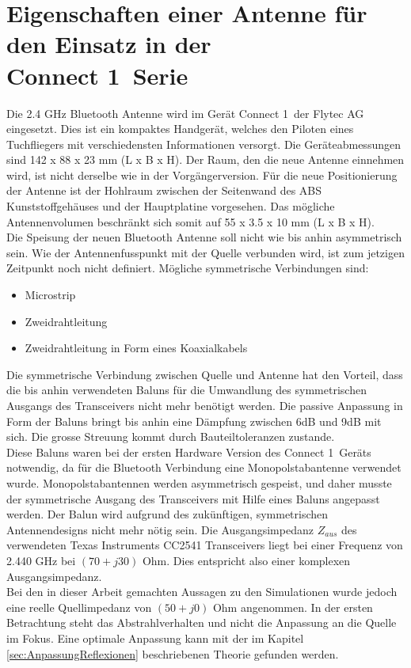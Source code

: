 \section{Eigenschaften einer Antenne für den Einsatz in der \\ \glqq Connect 1\grqq \ Serie}\label{sec:EigenschaftenAntenne}
Die 2.4 GHz Bluetooth Antenne wird im Gerät \glqq Connect 1\grqq \ der Flytec AG eingesetzt. Dies ist ein kompaktes Handgerät, welches den Piloten eines Tuchfliegers mit verschiedensten Informationen versorgt. Die Geräteabmessungen sind 142 x 88 x 23 mm (L x B x H). Der Raum, den die neue Antenne einnehmen wird, ist nicht derselbe wie in der Vorgängerversion. Für die neue Positionierung der Antenne ist der Hohlraum zwischen der Seitenwand des ABS Kunststoffgehäuses und der Hauptplatine vorgesehen. Das mögliche Antennenvolumen beschränkt sich somit auf 55 x 3.5 x 10 mm (L x B x H).\\
Die Speisung der neuen Bluetooth Antenne soll nicht wie bis anhin asymmetrisch sein. Wie der Antennenfusspunkt mit der Quelle verbunden wird, ist zum jetzigen Zeitpunkt noch nicht definiert. Mögliche symmetrische Verbindungen sind:
\begin{itemize}
\item Microstrip 
\item Zweidrahtleitung
\item Zweidrahtleitung in Form eines Koaxialkabels
\end{itemize}
Die symmetrische Verbindung zwischen Quelle und Antenne hat den Vorteil, dass die bis anhin verwendeten Baluns für die Umwandlung des symmetrischen Ausgangs des Transceivers nicht mehr benötigt werden. Die passive Anpassung in Form der Baluns bringt bis anhin eine Dämpfung zwischen 6dB und 9dB mit sich. Die grosse Streuung kommt durch Bauteiltoleranzen zustande.\\
Diese Baluns waren bei der ersten Hardware Version des \glqq Connect 1\grqq \ Geräts notwendig, da für die Bluetooth Verbindung eine Monopolstabantenne verwendet wurde. Monopolstabantennen werden asymmetrisch gespeist, und daher musste der symmetrische Ausgang des Transceivers mit Hilfe eines Baluns angepasst werden. Der Balun wird aufgrund des zukünftigen, symmetrischen Antennendesigns nicht mehr nötig sein. Die Ausgangsimpedanz $Z_{aus}$ des verwendeten Texas Instruments CC2541 Transceivers liegt bei einer Frequenz von 2.440 GHz bei $(70+j30)$ Ohm. Dies entspricht also einer komplexen Ausgangsimpedanz. \\
Bei den in dieser Arbeit gemachten Aussagen zu den Simulationen wurde jedoch eine reelle Quellimpedanz von $(50+j0)$ Ohm angenommen. In der ersten Betrachtung steht das Abstrahlverhalten und nicht die Anpassung an die Quelle im Fokus. Eine optimale Anpassung kann mit der im Kapitel \ref{sec:AnpassungReflexionen} beschriebenen Theorie gefunden werden.\\
